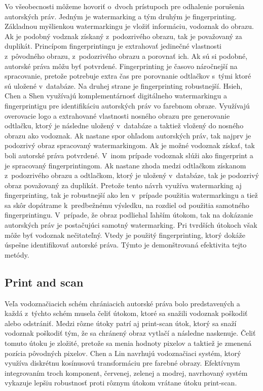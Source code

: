 Vo všeobecnosti môžeme hovoriť o~dvoch prístupoch pre odhalenie porušenia autorských práv. Jedným je watermarking a tým druhým je fingerprinting. Základnou myšlienkou watermarkingu je vložiť informáciu, vodoznak do obrazu. Ak je podobný vodznak získaný z~podozrivého obrazu, tak je považovaný za duplikát. Princípom fingerprintingu je extrahovať jedinečné vlastnosti z~pôvodného obrazu, z~podozrivého obrazu a porovnať ich. Ak sú si podobné, autorské práva môžu byť potvrdené. Fingerprinting je časovo náročnejší na spracovanie, pretože potrebuje extra čas pre porovnanie odtlačkov s~tými ktoré sú uložené v~databáze. Na druhej strane je fingerprinting robustnejší. \cite{Hsieh2014}
Hsieh, Chen a Shen \cite{Hsieh2014} využívajú komplementárnosť digitálneho watermarkingu a fingerprintigu pre identifikáciu autorských práv vo farebnom obraze. Využívajú overovacie logo a extrahované vlastnosti nosného obrazu pre generovanie odtlačku, ktorý je následne uložený v~databáze a taktiež vložený do nosného obrazu ako vodoznak. Ak nastane spor ohľadom autorských práv, tak najprv je podozrivý obraz spracovaný watermarkingom. Ak je možné vodoznak získať, tak boli autorské práva potvrdené. V~inom prípade vodoznak slúži ako fingerprint a je spracovaný fingerprintingom. Ak nastane zhoda medzi odtlačkom získanom z~podozrivého obrazu a odtlačkom, ktorý je uložený v~databáze, tak je podozrivý obraz považovaný za duplikát. Pretože tento návrh využíva watermarking aj fingerprinting, tak je robustnejší ako len v~prípade použitia watermarkingu a tiež sa skôr dopátrame k~predbežnému výsledku, na rozdiel od použitia samotného fingerprintingu. V~prípade, že obraz podliehal ľahším útokom, tak na dokázanie autorských práv je postačujúci samotný watermarking. Pri tvrdších útokoch však môže byť vodoznak nečitateľný. Vtedy je použitý fingerprinting, ktorý dokáže úspešne identifikovať autorské práva. Týmto je demonštrovaná efektivita tejto metódy.

\subsection{Print and scan}
Veľa vodoznačiacich schém chrániacich autorské práva bolo predstavených a každá z~týchto schém musela čeliť útokom, ktoré sa snažili vodoznak poškodiť alebo odstrániť. Medzi rôzne útoky patrí aj print-scan útok, ktorý sa snaží vodoznak poškodiť tým, že sa chránený obraz vytlačí a následne naskenuje. Čeliť tomuto útoku je zložité, pretože sa menia hodnoty pixelov a taktiež je zmenená pozícia pôvodných pixelov. Chen a Lin \cite{Chen} navrhujú vodoznačiaci systém, ktorý využíva diskrétnu kosínusovú transformáciu pre farebné obrazy. Efektívnym integrovaním troch komponent, červenej, zelenej a modrej, navrhovaný systém vykazuje lepšiu robustnosť proti rôznym útokom vrátane útoku print-scan.

